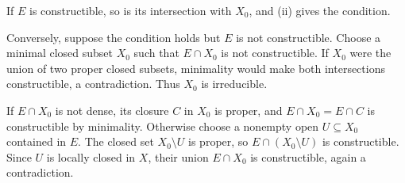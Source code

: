 If $E$ is constructible, so is its intersection with $X_0$, and (ii) gives the condition.

Conversely, suppose the condition holds but $E$ is not constructible. Choose a minimal closed subset $X_0$ such that $E\cap X_0$ is not constructible. If $X_0$ were the union of two proper closed subsets, minimality would make both intersections constructible, a contradiction. Thus $X_0$ is irreducible.

If $E\cap X_0$ is not dense, its closure $C$ in $X_0$ is proper, and $E\cap X_0=E\cap C$ is constructible by minimality. Otherwise choose a nonempty open $U\subseteq X_0$ contained in $E$. The closed set $X_0\setminus U$ is proper, so $E\cap(X_0\setminus U)$ is constructible. Since $U$ is locally closed in $X$, their union $E\cap X_0$ is constructible, again a contradiction.
